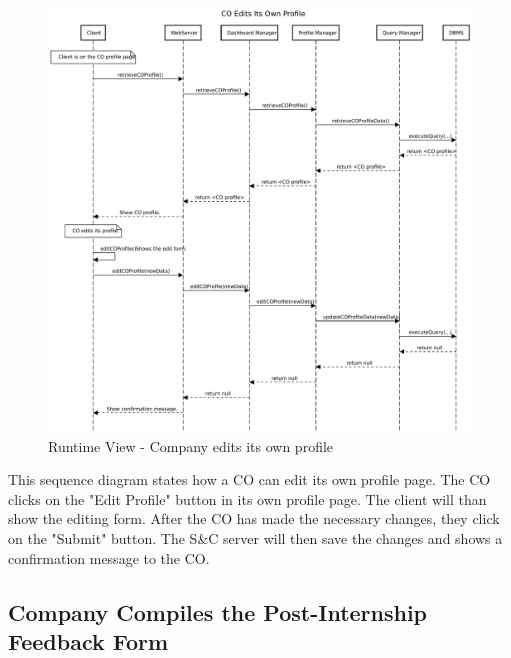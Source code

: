\begin{figure}[H]
      \centering
      \includegraphics[width=1.0\textwidth]{Images/RV_09.pdf}
      \caption{Runtime View - Company edits its own profile}
      \label{fig:rv-co-edits-profile}
\end{figure}

\par This sequence diagram states how a CO can edit its own profile page. The CO clicks on the "Edit Profile" button
in its own profile page. The client will than show the editing form. After the CO has made the necessary changes,
they click on the "Submit" button. The S\&C server will then save the changes and shows a confirmation message to the
CO.


\subsection{Company Compiles the Post-Internship Feedback Form}
\label{sub:company-compiles-the-post-internship-feedback-form}%

